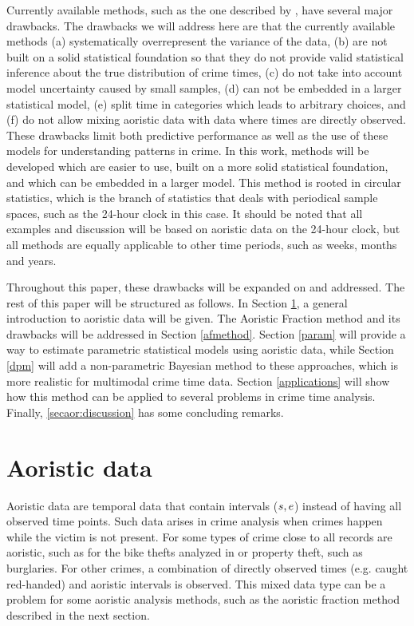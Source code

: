 Currently available methods, such as the one described by \citet{ashby2013comparison}, have several major drawbacks. The drawbacks we will address here are that the currently available methods (a) systematically overrepresent the variance of the data, (b)  are not built on a solid statistical foundation so that they do not provide valid statistical inference about the true distribution of crime times, (c) do not take into account model uncertainty caused by small samples, (d) can not  be embedded  in a larger statistical model, (e) split time in categories which leads to arbitrary choices, and (f) do not allow mixing aoristic data with data where times are directly observed. These drawbacks limit both predictive performance as well as the use of these models for understanding patterns in crime. In this work, methods will be developed which are easier to use, built on a more solid statistical foundation, and which can be embedded in a larger model. This method is rooted in circular statistics, which is the branch of statistics that deals with periodical sample spaces, such as the 24-hour clock in this case. It should be noted that all examples and discussion will be based on aoristic data on the 24-hour clock, but all methods are equally applicable to other time periods, such as weeks, months and years.

Throughout this paper, these drawbacks will be expanded on and addressed. The rest of this paper will be structured as follows. In Section \ref{aodata}, a general introduction to aoristic data will be given. The Aoristic Fraction method and its drawbacks will be addressed in Section \ref{afmethod}. Section \ref{param} will provide a way to estimate parametric statistical models using aoristic data, while Section \ref{dpm} will add a non-parametric Bayesian method to these approaches, which is more realistic for multimodal crime time data. Section \ref{applications} will show how this method can be applied to several problems in crime time analysis. Finally, \ref{secaor:discussion} has some concluding remarks.






\section{Aoristic data} \label{aodata}

Aoristic data are temporal data that contain intervals ($s, e$) instead of having all observed time points. Such data arises in crime analysis when crimes happen while the victim is not present. For some types of crime close to all records are aoristic, such as for the bike thefts analyzed in \citet{ashby2013comparison} or property theft, such as burglaries. For other crimes, a combination of directly observed times (e.g. caught red-handed) and aoristic intervals is observed. This mixed data type can be a problem for some aoristic analysis methods, such as the aoristic fraction method described in the next section.


